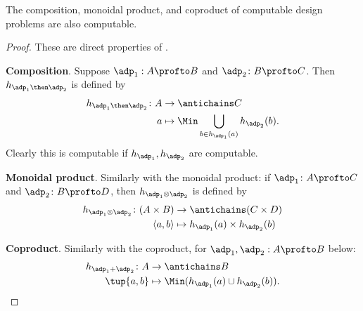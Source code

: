 \begin{proposition}
The composition, monoidal product, and coproduct of computable design problems are also computable.
\end{proposition}

\begin{proof}
These are direct properties of \DP.

 

\textbf{Composition}. Suppose $\adp_1 : A \profto B$ and $\adp_2 \colon B \profto C$. Then $h_{\adp_1\then \adp_2} $ is defined by
\begin{equation}
\begin{aligned}
h_{\adp_1 \then \adp_2} \colon A &\to \antichains C \\
a &\mapsto \Min \bigcup_{b \in h_{\adp_1}(a)} h_{\adp_2}(b).
\end{aligned}
\end{equation}
Clearly this is computable if $h_{\adp_1}, h_{\adp_2}$ are computable.

 

\textbf{Monoidal product}. Similarly with the monoidal product: if $\adp_1 \colon A \profto C$ and $\adp_2 \colon B \profto D$, then $h_{\adp_1 \otimes \adp_2}$ is defined by
\begin{equation}
\begin{aligned}
h_{\adp_1 \otimes \adp_2} \colon (A \times B) &\to \antichains (C \times D) \\
\langle a, b \rangle &\mapsto h_{\adp_1}(a) \times h_{\adp_2}(b)
\end{aligned}
\end{equation}

\textbf{Coproduct}. Similarly with the coproduct, for $\adp_1, \adp_2 : A \profto B$ below:
\begin{equation}
\begin{aligned}
h_{\adp_1 + \adp_2} \colon  A &\to \antichains B \\
\tup{a,b} &\mapsto \Min (h_{\adp_1}(a) \cup h_{\adp_2}(b)).
\end{aligned}
\end{equation}

 
\end{proof}

